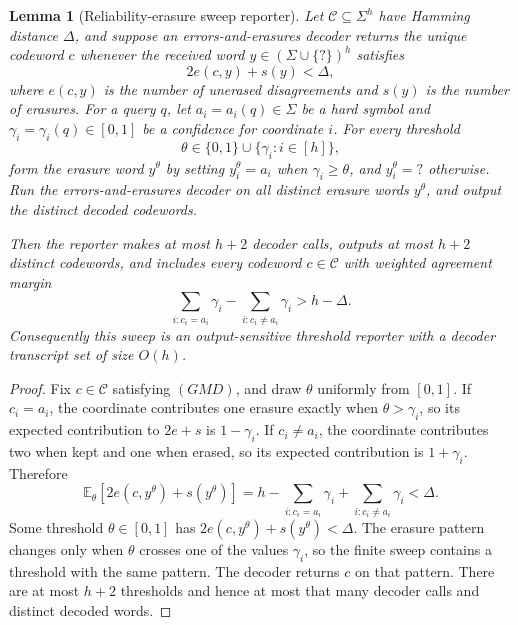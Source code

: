 \documentclass[10pt]{article}
\newtheorem{lemma}[theorem]{Lemma}
\theoremstyle{definition}
\newcommand{\E}{\mathbb{E}}
\begin{document}
\begin{lemma}[Reliability-erasure sweep reporter]
   \label{lem:reliability-erasure-sweep}
   Let \(\mathcal C\subseteq\Sigma^h\) have Hamming distance \(\Delta\), and
   suppose an errors-and-erasures decoder returns the unique codeword \(c\)
   whenever the received word \(y\in(\Sigma\cup\{?\})^h\) satisfies
   \[
      2e(c,y)+s(y)<\Delta,
   \]
   where \(e(c,y)\) is the number of unerased disagreements and \(s(y)\) is
   the number of erasures.  For a query \(q\), let
   \(a_i=a_i(q)\in\Sigma\) be a hard symbol and
   \(\gamma_i=\gamma_i(q)\in[0,1]\) be a confidence for coordinate \(i\).
   For every threshold
   \[
      \theta\in\{0,1\}\cup\{\gamma_i:i\in[h]\},
   \]
   form the erasure word \(y^\theta\) by setting
   \(y^\theta_i=a_i\) when \(\gamma_i\ge\theta\), and
   \(y^\theta_i=?\) otherwise.  Run the errors-and-erasures decoder on all
   distinct erasure words \(y^\theta\), and output the distinct decoded
   codewords.

   Then the reporter makes at most \(h+2\) decoder calls, outputs at most
   \(h+2\) distinct codewords, and includes every codeword
   \(c\in\mathcal C\) with weighted agreement margin
   \[
      \sum_{i:c_i=a_i}\gamma_i
      -
      \sum_{i:c_i\ne a_i}\gamma_i
      >
      h-\Delta .
      \tag{GMD}
   \]
   Consequently this sweep is an output-sensitive threshold reporter with a
   decoder transcript set of size \(O(h)\).
\end{lemma}

\begin{proof}
   Fix \(c\in\mathcal C\) satisfying \((GMD)\), and draw
   \(\theta\) uniformly from \([0,1]\).  If \(c_i=a_i\), the coordinate
   contributes one erasure exactly when \(\theta>\gamma_i\), so its expected
   contribution to \(2e+s\) is \(1-\gamma_i\).  If \(c_i\ne a_i\), the
   coordinate contributes two when kept and one when erased, so its expected
   contribution is \(1+\gamma_i\).  Therefore
   \[
      \E_\theta[2e(c,y^\theta)+s(y^\theta)]
      =
      h
      -
      \sum_{i:c_i=a_i}\gamma_i
      +
      \sum_{i:c_i\ne a_i}\gamma_i
      <\Delta .
   \]
   Some threshold \(\theta\in[0,1]\) has
   \(2e(c,y^\theta)+s(y^\theta)<\Delta\).  The erasure pattern changes only
   when \(\theta\) crosses one of the values \(\gamma_i\), so the finite sweep
   contains a threshold with the same pattern.  The decoder returns \(c\) on
   that pattern.  There are at most \(h+2\) thresholds and hence at most that
   many decoder calls and distinct decoded words.
\end{proof}
\end{document}

